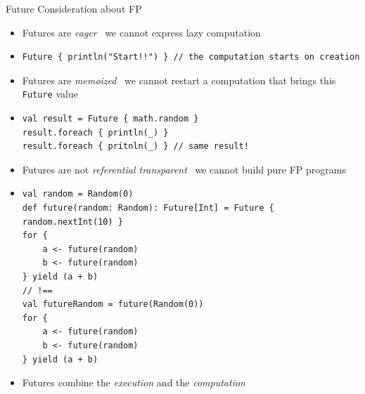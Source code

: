 \documentclass[presentation, 9pt]{beamer}\mode<presentation>{\usetheme{AMSBolognaFC}}
\begin{document}
\begin{frame}[fragile]{Future Consideration about FP}
\begin{itemize}
	\item Futures are \emph{eager} \faArrowRight \, we cannot express lazy computation
	\item[] 	\begin{tcolorbox}[left=0pt, top=0pt, bottom=0pt]
		\begin{verbatim}
Future { println("Start!!") } // the computation starts on creation
		\end{verbatim}
	\end{tcolorbox}
 	\item Futures are \emph{memoized} \faArrowRight \, we cannot restart a computation that brings this \texttt{Future} value
	 \item[] 	\begin{tcolorbox}[left=0pt, top=0pt, bottom=0pt]
		\begin{verbatim}
val result = Future { math.random }
result.foreach { println(_) }
result.foreach { pritnln(_) } // same result!
		\end{verbatim}
	\end{tcolorbox}
  \item Futures are not \emph{referential transparent} \faArrowRight \, we cannot build pure FP programs
	\item[] 	\begin{tcolorbox}[left=0pt, top=0pt, bottom=0pt]
		\begin{verbatim}
val random = Random(0)
def future(random: Random): Future[Int] = Future { random.nextInt(10) }
for {
	a <- future(random)
	b <- future(random)
} yield (a + b)
// !==
val futureRandom = future(Random(0))
for {
	a <- future(random)
	b <- future(random)
} yield (a + b)
		\end{verbatim}
	\end{tcolorbox}
	\item Futures combine the \emph{execution} and the \emph{computation} 
\end{itemize}
\end{frame}
\end{document}

